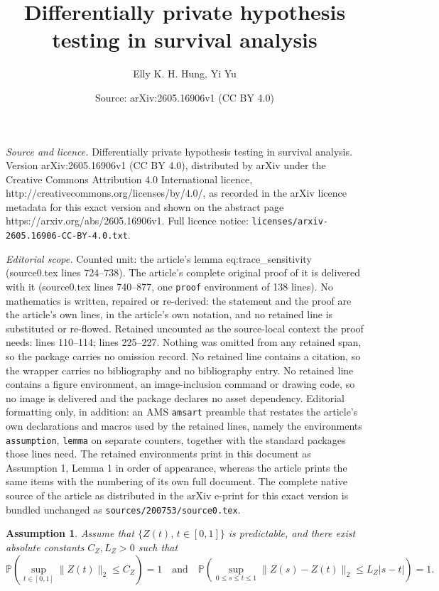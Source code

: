 \documentclass[10pt,a4paper]{amsart}
\title{Differentially private hypothesis testing in survival analysis}
\author{Elly K. H. Hung, Yi Yu}
\date{Source: arXiv:2605.16906v1 (CC BY 4.0)}
\newtheorem{assumption}{Assumption}
\begin{document}
\maketitle

\noindent\emph{Source and licence.} Differentially private hypothesis testing in survival analysis. Version arXiv:2605.16906v1 (CC BY 4.0), distributed by arXiv under the Creative Commons Attribution 4.0 International licence, http://creativecommons.org/licenses/by/4.0/, as recorded in the arXiv licence metadata for this exact version and shown on the abstract page https://arxiv.org/abs/2605.16906v1. Full licence notice: \texttt{licenses/arxiv-2605.16906-CC-BY-4.0.txt}.\par\smallskip

\noindent\textit{Editorial scope.} Counted unit: the article's lemma eq:trace\_sensitivity (source0.tex lines 724--738). The article's complete original proof of it is delivered with it (source0.tex lines 740--877, one \texttt{proof} environment of 138 lines). No mathematics is written, repaired or re-derived: the statement and the proof are the article's own lines, in the article's own notation, and no retained line is substituted or re-flowed.  Retained uncounted as the source-local context the proof needs: lines 110--114; lines 225--227.  Nothing was omitted from any retained span, so the package carries no omission record.  No retained line contains a citation, so the wrapper carries no bibliography and no bibliography entry.  No retained line contains a figure environment, an image-inclusion command or drawing code, so no image is delivered and the package declares no asset dependency.  Editorial formatting only, in addition: an AMS \texttt{amsart} preamble that restates the article's own declarations and macros used by the retained lines, namely the environments \texttt{assumption}, \texttt{lemma} on separate counters, together with the standard packages those lines need.  The retained environments print in this document as Assumption 1, Lemma 1 in order of appearance, whereas the article prints the same items with the numbering of its own full document.  The complete native source of the article as distributed in the arXiv e-print for this exact version is bundled unchanged as \texttt{sources/200753/source0.tex}.
\begin{assumption} \label{assp:covariates} Assume that $\{Z(t), \,t \in [0, 1]\}$ is predictable, and there exist absolute constants $C_Z, L_Z >0$ such that 
\begin{equation*}
     \mathbb{P}\left(\sup_{t \in [0, 1]} \|Z(t)\|_2 \leq C_Z \right) = 1 \quad \mathrm{and} \quad \mathbb{P} \left( \sup_{0 \leq s \leq t \leq 1} \|Z(s) - Z(t)\|_2 \leq L_Z|s- t| \right) = 1.
\end{equation*}
\end{assumption}
\end{document}
